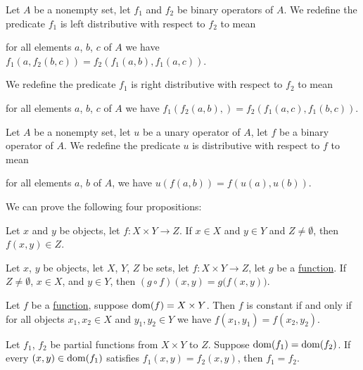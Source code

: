 \documentclass{article}
\begin{document}
\begin{definition}
Let $A$ be a nonempty set, let $f_{1}$ and $f_{2}$ be binary operators
of $A$.
We redefine the predicate $f_{1}$ is left distributive with respect to
$f_{2}$ to mean
\begin{defn}
\item for all elements $a$, $b$, $c$ of $A$ we have $f_{1}(a,f_{2}(b,c))=f_{2}(f_{1}(a,b),f_{1}(a,c))$.
\end{defn}
We redefine the predicate $f_{1}$ is right distributive with respect to
$f_{2}$ to mean
\begin{defn}
\item for all elements $a$, $b$, $c$ of $A$ we have $f_{1}(f_{2}(a,b),)=f_{2}(f_{1}(a,c),f_{1}(b,c))$.
\end{defn}
\end{definition}

\begin{definition}
Let $A$ be a nonempty set, let $u$ be a unary operator of $A$, let $f$
be a binary operator of $A$. We redefine the predicate $u$ is
distributive with respect to $f$ to mean
\begin{defn}
\item for all elements $a$, $b$ of $A$, we have $u(f(a,b))=f(u(a),u(b))$.
\end{defn}
\end{definition}

We can prove the following four propositions:
\begin{thm}
\item\label{binop1:17} Let $x$ and $y$ be objects, let $f\colon X\times Y\to Z$.
  If $x\in X$ and $y\in Y$ and $Z\neq\emptyset$,
  then $f(x,y)\in Z$.
\item\label{binop1:18} Let $x$, $y$ be objects, let $X$, $Y$, $Z$ be
  sets,
  let $f\colon X\times Y\to Z$, let $g$ be a \hyperlink{definition:funct1:nm1}{function}.
  If $Z\neq\emptyset$, $x\in X$, and $y\in Y$,
  then $(g\circ f)(x,y)=g\bigl(f(x,y)\bigr)$.
\item\label{binop1:19}
  Let $f$ be a \hyperlink{definition:funct1:nm1}{function},
  suppose $\operatorname{dom}(f)=X\times Y$.
  Then $f$ is constant if and only if for all objects $x_{1},x_{2}\in X$
  and $y_{1},y_{2}\in Y$ we have $f(x_{1},y_{1})=f(x_{2},y_{2})$.
\item\label{binop1:20} Let $f_{1}$, $f_{2}$ be partial functions from
  $X\times Y$ to $Z$. Suppose $\operatorname{dom}(f_{1})=\operatorname{dom}(f_{2})$.
  If every $(x,y)\in\operatorname{dom}(f_{1})$ satisfies $f_{1}(x,y)=f_{2}(x,y)$,
  then $f_{1}=f_{2}$.
\end{thm}
\end{document}
